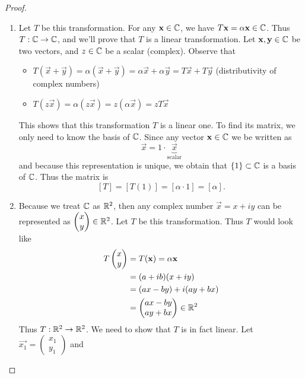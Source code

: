 \documentclass{article}
\begin{document}
\begin{proof}
  \text{}
  \begin{enumerate}
    \item Let $T$ be this transformation. For any $\vec{x}\in\C$, we have
      $T\vec{x}=\alpha \vec{x}\in\C$.
      Thus $T:\C\to\C$, and we'll prove that $T$ is a linear 
      transformation. Let $\vec{x},\vec{y}\in\C$ be two vectors, 
      and $z\in\C$ be a scalar (complex). Observe that
      \begin{itemize}
        \item $T(\vec{x}+\vec{y})=\alpha(\vec{x}+\vec{y})
          =\alpha\vec{x}+\alpha\vec{y}=T\vec{x}+T\vec{y}$
          \quad (distributivity of complex numbers)
        \item $T(z\vec{x})=\alpha(z\vec{x})=z(\alpha\vec{x})=zT\vec{x}$
      \end{itemize}
      This shows that this transformation $T$ is a linear one.
      To find its matrix, we only need to know the basis of $\C$.
      Since any vector $\vec{x}\in\C$ we be written as 
      \[\vec{x}=1\cdot \underbrace{\vec{x}}_{\text{scalar}}\]
      and because this representation is unique, we obtain that 
      $\{1\}\subset\C$ is a basis of $\C$. Thus the matrix is
      \[
        [T]=[T(1)]=[\alpha\cdot 1]=[\alpha].
      \]
    \item Because we treat $\C$ as $\R^2$, then any complex number 
      $\vec{x}=x+iy$ can be represented as 
      $\begin{pmatrix} x\\y \end{pmatrix}\in\R^2$.
      Let $T$ be this transformation. Thus $T$ would look like
      \begin{align*}
        T\begin{pmatrix} x\\y \end{pmatrix}
        &=T(\vec{x})=\alpha\vec{x}\\
        &=(a+ib)(x+iy)\\
        &=(ax-by)+i(ay+bx)\\
        &=\begin{pmatrix} ax-by\\ay+bx \end{pmatrix}\in\R^2
      \end{align*}
      Thus $T:\R^2\to\R^2$.
      We need to show that $T$ is in fact linear. Let 
      $\vec{x_1}= \begin{pmatrix} x_1\\y_1 \end{pmatrix} $ and 

\end{enumerate}
\end{proof}
\end{document}
